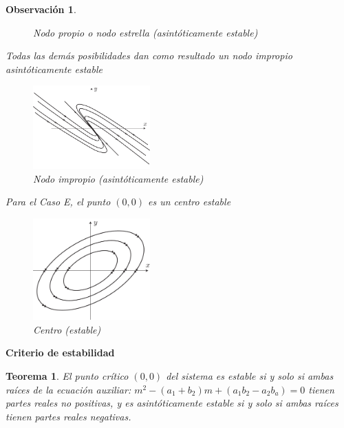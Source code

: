 \documentclass[a5paper,doc,10pt,noapacite]{apa6}
\newtheorem{teorema}{Teorema}
\newtheorem{observ}{Observación}
\newcommand{\neodefi}[1]{%
	\vspace{1\baselineskip}
	\textbf{\small#1} \newline
}
\begin{document}
{{\begin{observ}
\begin{APAenumerate}
\begin{figure}[H]
		\caption{Nodo propio o nodo estrella (asintóticamente estable)}
		\label{fig:M-14}
	\end{figure}
		
		
		\item Todas las demás posibilidades dan como resultado un nodo impropio asintóticamente estable
		\vspace{-1\baselineskip}
	\begin{figure}[H]
		\captionsetup{justification=centering, labelfont=footnotesize, font=footnotesize}
		\centering
		\includegraphics[width=4.5cm]{Graficos/figura15}
	
		\caption{Nodo impropio (asintóticamente estable)}
		\label{fig:M-15}
	\end{figure}
	\end{APAenumerate}

Para el Caso E, el punto \((0,0)\) es un centro estable
\vspace{-1\baselineskip}
	\begin{figure}[H]
		\captionsetup{justification=centering, labelfont=footnotesize, font=footnotesize}
		\centering
		\includegraphics[width=4.5cm]{Graficos/figura6}
	
		\caption{Centro (estable)}
		\label{fig:M-16}
	\end{figure}
\end{observ}


%
\neodefi{Criterio de estabilidad}


\begin{teorema}\label{teo-2}
	El punto crítico \((0,0)\) del sistema es estable si y solo si  ambas raíces de la ecuación auxiliar: \(m^2-(a_1+b_2)m+(a_1b_2-a_2b_a)=0\) tienen partes reales no positivas, y es  asintóticamente estable si y solo si 	ambas raíces tienen partes reales negativas.
\end{teorema}

}}
\end{document}
